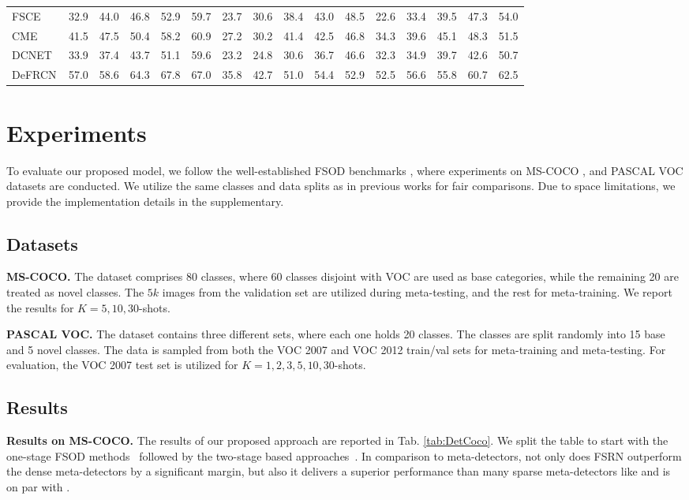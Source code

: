 \documentclass[10pt,twocolumn,letterpaper]{article}
\begin{document}
\begin{table*}[t!]
\begin{center}
{\begin{tabular}{l | ccccc | ccccc | ccccc}
    FSCE~\cite{FSCE}&32.9 &44.0 &46.8 &52.9 &59.7 &23.7 &30.6 &38.4 &43.0 &48.5 &22.6 &33.4 &39.5 &47.3 &54.0\\
    CME~\cite{CME}& 41.5 &47.5 &50.4 &58.2 &60.9 &27.2 &30.2 &41.4 &42.5 &46.8 &34.3 &39.6 &45.1 &48.3 &51.5\\
    DCNET~\cite{DCNET}&33.9 & 37.4 &43.7 &51.1 &59.6 &23.2 &24.8 &30.6 &36.7 &46.6 &32.3& 34.9& 39.7& 42.6& 50.7\\
    DeFRCN\cite{defrcn}& 57.0 & 58.6 & 64.3 & 67.8 & 67.0 & 35.8 & 42.7 & 51.0 & 54.4 & 52.9 & 52.5 & 56.6 & 55.8 & 60.7 & 62.5 \\
	\bottomrule
	\end{tabular}}
	\end{center}
\vspace{-2em}
\end{table*}


 
\section{Experiments}
To evaluate our proposed model, we follow the well-established FSOD benchmarks \cite{FSRW, TFA, MPSR}, where experiments on MS-COCO \cite{coco}, and PASCAL VOC \cite{pascalvoc} datasets are conducted. We utilize the same classes and data splits as in previous works \cite{FSRW, TFA, MPSR} for fair comparisons. Due to space limitations, we provide the implementation details in the supplementary.
\subsection{Datasets}

\textbf{MS-COCO.} The dataset comprises 80 classes, where 60 classes disjoint with VOC are used as base categories, while the remaining 20 are treated as novel classes. The $5k$ images from the validation set are utilized during meta-testing, and the rest for meta-training. We report the results for $K=5, 10, 30$-shots. 

\textbf{PASCAL VOC.} The dataset contains three different sets, where each one holds 20 classes. The classes are split randomly into 15 base and 5 novel classes. The data is sampled from both the VOC 2007 and VOC 2012 train/val sets for meta-training and meta-testing. For evaluation, the VOC 2007 test set is utilized for $K= 1,2,3,5,10,30$-shots.

\subsection{Results}
\textbf{Results on MS-COCO.} The results of our proposed approach are reported in Tab. \ref{tab:DetCoco}. We split the table to start with the one-stage FSOD methods~\cite{FSRW, MetaDet, once} followed by the two-stage based approaches~\cite{LSTD, MetaDet, MetaRCNN, TFA, MPSR, FsDetView, FSOD-RPN, FSCE, DCNET, CME, defrcn}. In comparison to meta-detectors, not only does FSRN outperform the dense meta-detectors by a significant margin, but also it delivers a superior performance than many sparse meta-detectors like \cite{MetaRCNN, FsDetView, FSOD-RPN} and is on par with \cite{CME, DCNET}.    
\end{document}
